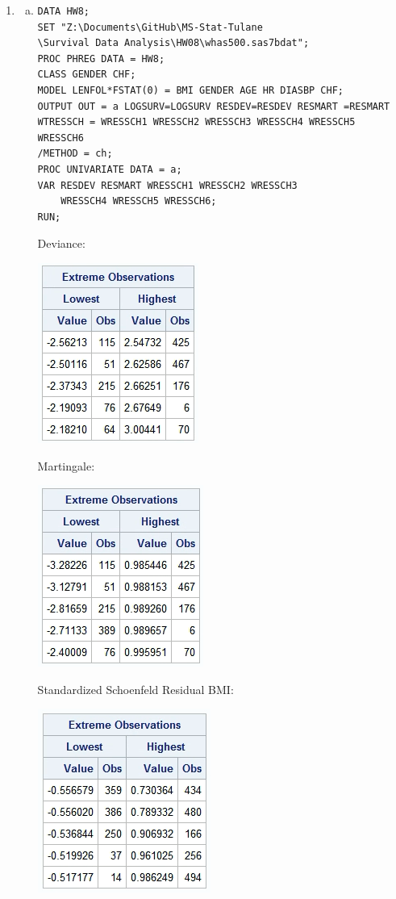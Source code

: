 \documentclass{elegantbook}
\begin{document}
\begin{solution}
    \begin{enumerate}
        \item 
        \begin{enumerate}[(a)]
            \item \begin{verbatim}
DATA HW8;
SET "Z:\Documents\GitHub\MS-Stat-Tulane
\Survival Data Analysis\HW08\whas500.sas7bdat";
PROC PHREG DATA = HW8; 
CLASS GENDER CHF; 
MODEL LENFOL*FSTAT(0) = BMI GENDER AGE HR DIASBP CHF; 
OUTPUT OUT = a LOGSURV=LOGSURV RESDEV=RESDEV RESMART =RESMART
WTRESSCH = WRESSCH1 WRESSCH2 WRESSCH3 WRESSCH4 WRESSCH5 WRESSCH6
/METHOD = ch;
PROC UNIVARIATE DATA = a; 
VAR RESDEV RESMART WRESSCH1 WRESSCH2 WRESSCH3 
    WRESSCH4 WRESSCH5 WRESSCH6; 
RUN; 
            \end{verbatim}
            Deviance: \begin{center}
                \includegraphics[width=.3\textwidth]{dev.png}
            \end{center}
            Martingale: \begin{center}
                \includegraphics[width=.3\textwidth]{mar.png}
            \end{center}
            Standardized Schoenfeld Residual BMI: \begin{center}
                \includegraphics[width=.3\textwidth]{bmi.png}

\end{center}
\end{enumerate}
\end{enumerate}
\end{solution}
\end{document}
